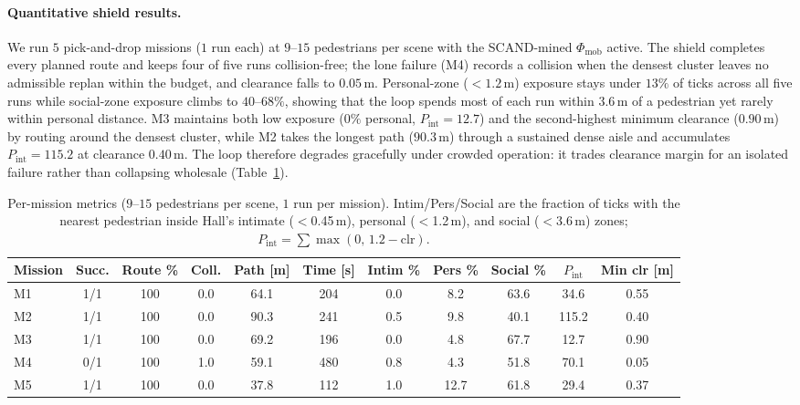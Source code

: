 \paragraph{Quantitative shield results.}
We run $5$ pick-and-drop missions ($1$ run each) at $9$--$15$ pedestrians per scene with the SCAND-mined $\Phi_{\mathrm{mob}}$ active. The shield completes every planned route and keeps four of five runs collision-free; the lone failure (M4) records a collision when the densest cluster leaves no admissible replan within the budget, and clearance falls to $0.05$\,m. Personal-zone (${<}1.2$\,m) exposure stays under $13\%$ of ticks across all five runs while social-zone exposure climbs to $40$--$68\%$, showing that the loop spends most of each run within $3.6$\,m of a pedestrian yet rarely within personal distance. M3 maintains both low exposure ($0\%$ personal, $P_{\mathrm{int}}{=}12.7$) and the second-highest minimum clearance ($0.90$\,m) by routing around the densest cluster, while M2 takes the longest path ($90.3$\,m) through a sustained dense aisle and accumulates $P_{\mathrm{int}}{=}115.2$ at clearance $0.40$\,m. The loop therefore degrades gracefully under crowded operation: it trades clearance margin for an isolated failure rather than collapsing wholesale (Table~\ref{tab:factory_missions}).

\begin{table}[!ht]
\centering
\caption{Per-mission metrics ($9$--$15$ pedestrians per scene, $1$ run per mission). Intim/Pers/Social are the fraction of ticks with the nearest pedestrian inside Hall's intimate ($<$0.45\,m), personal ($<$1.2\,m), and social ($<$3.6\,m) zones; $P_{\mathrm{int}}=\sum\max(0,\,1.2-\mathrm{clr})$.}
\label{tab:factory_missions}
\small
\setlength{\tabcolsep}{3pt}
\begin{tabular}{lcccccccccc}
\toprule
Mission & Succ. & Route \% & Coll. & Path [m] & Time [s] & Intim \% & Pers \% & Social \% & $P_{\mathrm{int}}$ & Min clr [m] \\
\midrule
M1 & 1/1 & 100 & 0.0 & 64.1 & 204 & 0.0 &  8.2 & 63.6 &  34.6 & 0.55 \\
M2 & 1/1 & 100 & 0.0 & 90.3 & 241 & 0.5 &  9.8 & 40.1 & 115.2 & 0.40 \\
M3 & 1/1 & 100 & 0.0 & 69.2 & 196 & 0.0 &  4.8 & 67.7 &  12.7 & 0.90 \\
M4 & 0/1 & 100 & 1.0 & 59.1 & 480 & 0.8 &  4.3 & 51.8 &  70.1 & 0.05 \\
M5 & 1/1 & 100 & 0.0 & 37.8 & 112 & 1.0 & 12.7 & 61.8 &  29.4 & 0.37 \\
\bottomrule
\end{tabular}
\end{table}

